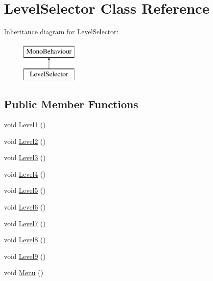 \hypertarget{class_level_selector}{}\section{Level\+Selector Class Reference}
\label{class_level_selector}
Inheritance diagram for Level\+Selector\+:\begin{figure}[H]
\begin{center}
\leavevmode
\includegraphics[height=2.000000cm]{class_level_selector}
\end{center}
\end{figure}
\subsection*{Public Member Functions}
\begin{DoxyCompactItemize}
\item 
void \mbox{\hyperlink{class_level_selector_a9f5a0a4de4a6d9fbec81ed65cc0f7728}{Level1}} ()
\item 
void \mbox{\hyperlink{class_level_selector_adeb0b4be0958981b1a1a5a620361bc30}{Level2}} ()
\item 
void \mbox{\hyperlink{class_level_selector_a5dfc03a08d600ba73bdd2de47782d3d0}{Level3}} ()
\item 
void \mbox{\hyperlink{class_level_selector_aa2a04a7aabb5008cc36cadef9921e10b}{Level4}} ()
\item 
void \mbox{\hyperlink{class_level_selector_a3cbc0621c0e2c2533ee6be55bab1e519}{Level5}} ()
\item 
void \mbox{\hyperlink{class_level_selector_a9b7572b24c4f628e31bb4a0d4d35dfee}{Level6}} ()
\item 
void \mbox{\hyperlink{class_level_selector_a85b373b055b331c885add13d097251d5}{Level7}} ()
\item 
void \mbox{\hyperlink{class_level_selector_a902e7d01b59f6c6affb89c28c9529a88}{Level8}} ()
\item 
void \mbox{\hyperlink{class_level_selector_a8be23d6e76b3eaf708f2ddeb733addac}{Level9}} ()
\item 
void \mbox{\hyperlink{class_level_selector_a3fe4d7253904b5b7556aa52401136b45}{Menu}} ()
\end{DoxyCompactItemize}


